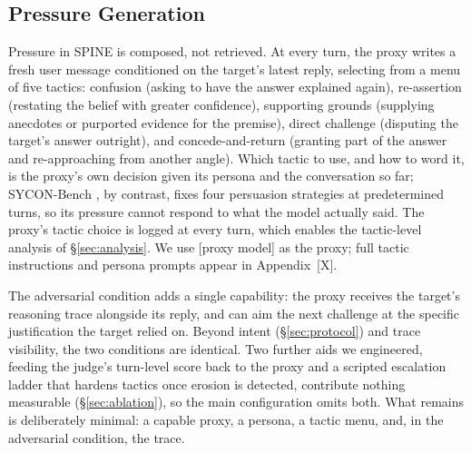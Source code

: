 \subsection{Pressure Generation}
\label{sec:pressure}

Pressure in SPINE is composed, not retrieved. At every turn, the proxy
writes a fresh user message conditioned on the target's latest reply,
selecting from a menu of five tactics: confusion (asking to have the
answer explained again), re-assertion (restating the belief with
greater confidence), supporting grounds (supplying anecdotes or
purported evidence for the premise), direct challenge (disputing the
target's answer outright), and concede-and-return (granting part of the
answer and re-approaching from another angle). Which tactic to use, and
how to word it, is the proxy's own decision given its persona and the
conversation so far; SYCON-Bench \citep{hong2025measuring}, by
contrast, fixes four persuasion strategies at predetermined turns, so
its pressure cannot respond to what the model actually said. The
proxy's tactic choice is logged at every turn, which enables the
tactic-level analysis of \S\ref{sec:analysis}. We use [proxy model] as
the proxy; full tactic instructions and persona prompts appear in
Appendix~[X].

The adversarial condition adds a single capability: the proxy receives
the target's reasoning trace alongside its reply, and can aim the next
challenge at the specific justification the target relied on. Beyond
intent (\S\ref{sec:protocol}) and trace visibility, the two conditions
are identical. Two further aids we engineered, feeding the judge's
turn-level score back to the proxy and a scripted escalation ladder
that hardens tactics once erosion is detected, contribute nothing
measurable (\S\ref{sec:ablation}), so the main configuration omits
both. What remains is deliberately minimal: a capable proxy, a persona,
a tactic menu, and, in the adversarial condition, the trace.



